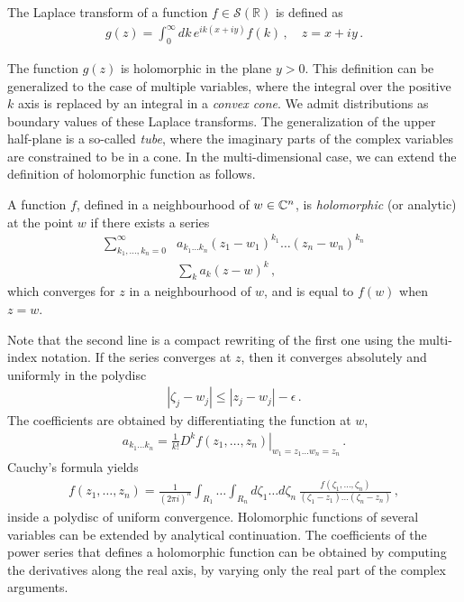\begin{Def}
    The Laplace transform of a function $f\in \mathcal{S}(\mathbb{R})$ is 
    defined as
    \begin{align}
        \label{eq:LaplaceTransfDef}
        g(z) = \int_0^\infty dk\, e^{i k (x+iy)} f(k)\, , \quad z=x+iy\, .
    \end{align}
\end{Def}
The function $g(z)$ is holomorphic in the plane $y>0$. This definition can be
generalized to the case of multiple variables, where the integral over the
positive $k$ axis is replaced by an integral in a {\em convex cone}. We admit
distributions as boundary values of these Laplace transforms. The generalization
of the upper half-plane is a so-called {\em tube}, where the imaginary parts of
the complex variables are constrained to be in a cone. In the multi-dimensional
case, we can extend the definition of holomorphic function as follows. 

\begin{Def}
    A function $f$, defined in a neighbourhood of $w \in \mathbb{C}^n$, is {\em
    holomorphic} (or analytic) at the point $w$ if there exists a series
    \begin{align}
        \label{eq:HoloSeriesDef}
        \sum_{k_1, \ldots, k_n=0}^\infty &a_{k_1 \ldots k_n} (z_1-w_1)^{k_1} \ldots
            (z_n - w_n)^{k_n} \\
        & \sum_k a_k (z-w)^k\, ,
    \end{align}
    which converges for $z$ in a neighbourhood of $w$, and is equal to $f(w)$
    when $z=w$. 
\end{Def}
Note that the second line is a compact rewriting of the first one using the
multi-index notation. If the series converges at $z$, then it converges
absolutely and uniformly in the polydisc
\begin{align}
    \left| \zeta_j - w_j \right| \leq |z_j - w_j| - \epsilon\, .
\end{align}
The coefficients are obtained by differentiating the function at $w$, 
\begin{align}
    \label{eq:CoeffsFromDerivs}
    a_{k_1\ldots k_n} = 
        \left. \frac{1}{k!} D^{k}f(z_1, \ldots, z_n) \right|_{w_1=z_1 \ldots w_n=z_n}\, .
\end{align}
Cauchy's formula yields
\begin{align}
    f(z_1, \ldots, z_n) = \frac{1}{(2\pi i)^n} \int_{R_1} \ldots \int_{R_n}
        d\zeta_1 \ldots d\zeta_n\,  
        \frac{f(\zeta_1, \ldots, \zeta_n)}{(\zeta_1 - z_1) \ldots (\zeta_n - z_n)}\, , 
\end{align}
inside a polydisc of uniform convergence. Holomorphic functions of several
variables can be extended by analytical continuation. The coefficients of the
power series that defines a holomorphic function can be obtained by computing
the derivatives along the real axis, \ie by varying only the real part of the
complex arguments. 

